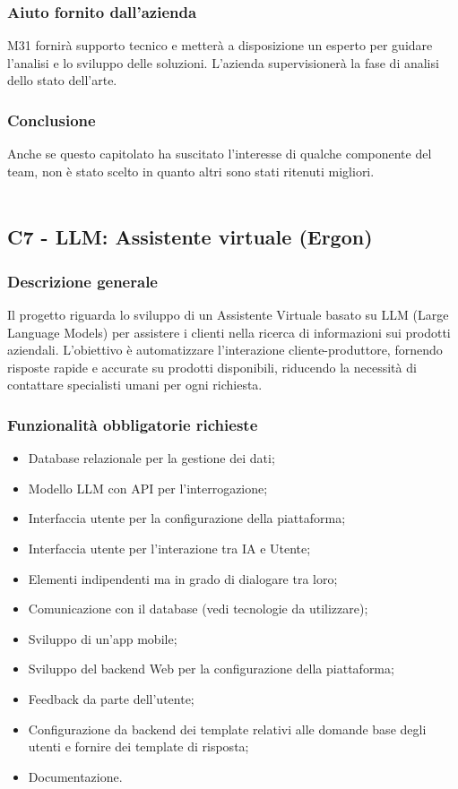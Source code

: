 \documentclass[10pt]{article}
\begin{document}
\subsubsection{Aiuto fornito dall'azienda}
M31 fornirà supporto tecnico e metterà a disposizione un esperto per guidare l'analisi e lo sviluppo delle soluzioni. L'azienda supervisionerà la fase di analisi dello stato dell'arte.
\subsubsection{Conclusione}
Anche se questo capitolato ha suscitato l'interesse di qualche componente del team, non è stato scelto in quanto altri sono stati ritenuti migliori.
\\\\
\subsection{C7 - LLM: Assistente virtuale (Ergon)}
\subsubsection{Descrizione generale}
Il progetto riguarda lo sviluppo di un Assistente Virtuale basato su LLM (Large Language Models) per assistere i clienti nella ricerca di informazioni sui prodotti aziendali. L'obiettivo è automatizzare l'interazione cliente-produttore, fornendo risposte rapide e accurate su prodotti disponibili, riducendo la necessità di contattare specialisti umani per ogni richiesta.

\subsubsection{Funzionalità obbligatorie richieste}
\begin{itemize}
 \item Database relazionale per la gestione dei dati;
 \item Modello LLM con API per l’interrogazione;
 \item Interfaccia utente per la configurazione della piattaforma;
 \item Interfaccia utente per l'interazione tra IA e Utente;
 \item Elementi indipendenti ma in grado di dialogare tra loro;
 \item Comunicazione con il database (vedi tecnologie da utilizzare);
 \item Sviluppo di un'app mobile;
 \item Sviluppo del backend Web per la configurazione della piattaforma;
 \item Feedback da parte dell’utente;
 \item Configurazione da backend dei template relativi alle domande base degli utenti e fornire dei template di risposta;
 \item Documentazione.
\end{itemize}
\end{document}
